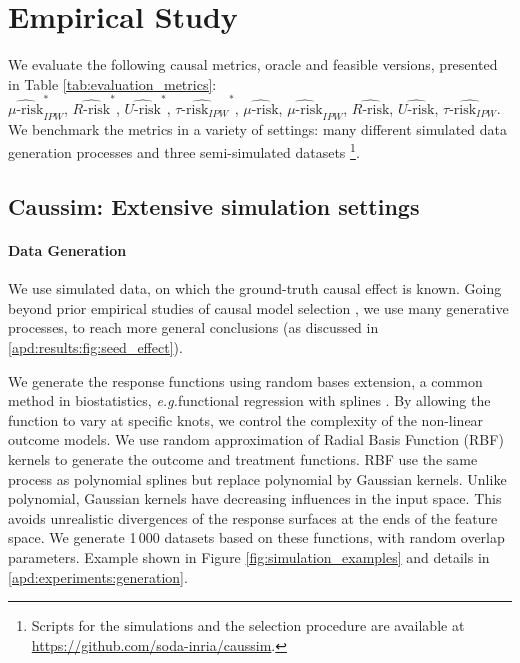 \documentclass[10pt,twocolumn]{article}
\newcommand{\eg}{\emph{e.g.}}
\begin{document}
\section{Empirical Study}\label{sec:empirical_study}


We evaluate the following causal metrics, oracle and feasible
versions, presented in Table
\ref{tab:evaluation_metrics}:\\
$\widehat{\mu\text{-risk}}_{IPW}^*$,
$\widehat{R\text{-risk}}^*$,
$\widehat{U\text{-risk}}^*$,
$\widehat{\tau\text{-risk}_{IPW}}^*$,
$\widehat{\mu\text{-risk}}$,
$\widehat{\mu\text{-risk}}_{IPW}$,
$\widehat{R\text{-risk}}$,
$\widehat{U\text{-risk}}$,
$\widehat{\tau\text{-risk}_{IPW}}$.
We benchmark the metrics in a variety of settings:
many different simulated data generation
processes and three semi-simulated datasets \footnote{Scripts for the simulations and the selection procedure are available at
    \url{https://github.com/soda-inria/caussim}.
}.

\subsection{Caussim: Extensive simulation settings}\label{subsec:simulations}

\paragraph{Data Generation}

We use simulated data, on which the ground-truth causal effect is known. Going
beyond prior empirical studies of causal model selection
\cite{schuler_comparison_2018,alaa_validating_2019}, we use many
generative processes, to reach more general conclusions (as discussed
in \ref{apd:results:fig:seed_effect}).

We generate the response functions using random bases extension, a common method
in biostatistics, \eg functional regression with splines
\cite{howe_splines_2011, perperoglou_review_2019}. By allowing the function to
vary at specific knots, we control the complexity of the non-linear outcome
models. We use random approximation of Radial Basis Function (RBF) kernels
\cite{rahimi_random_2008} to generate the outcome and treatment functions. RBF
use the same process as polynomial splines but replace polynomial by Gaussian
kernels. Unlike polynomial, Gaussian kernels have decreasing influences in the
input space. This avoids unrealistic divergences of the response surfaces at the
ends of the feature space. We generate 1\,000 datasets based on these functions,
with random overlap parameters. Example shown in Figure
\ref{fig:simulation_examples} and details in \ref{apd:experiments:generation}.
\end{document}
